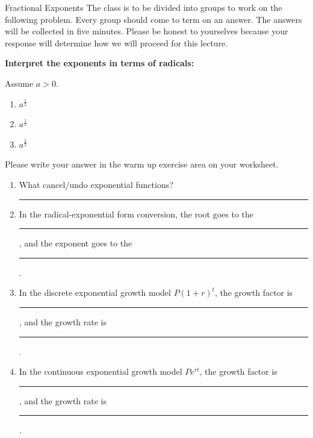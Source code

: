 \documentclass[10pt]{beamer}
\begin{document}
\begin{frame}{Fractional Exponents}
The class is to be divided into groups to work on the following problem. Every group should come to term on an answer. The answers will be collected in five minutes. Please be honest to yourselves because your response will determine how we will proceed for this lecture.

{\bf Interpret the exponents in terms of radicals:}

Assume $a>0$.
\begin{enumerate}[leftmargin = *, label = (\arabic*), itemsep=2em]
\item
\(a^\frac{1}{2}\)
\item 
\(a^\frac{1}{3}\)
\item 
\(a^\frac{2}{3}\)
\end{enumerate}
\end{frame}
\begin{frame}
Please write your answer in the warm up exercise area on your worksheet. 
\begin{enumerate}[leftmargin = *, label = (\arabic*), itemsep=2em]
\item
What cancel/undo exponential functions? \rule{6em}{0.4pt}
\item In the radical-exponential form conversion, the root goes to the \rule{6em}{0.4pt}, and the exponent goes to the \rule{6em}{0.4pt}.
\item In the discrete exponential growth model $P(1+r)^t$, the growth factor is \rule{6em}{0.4pt}, and the growth rate is \rule{6em}{0.4pt}.
\item In the continuous exponential growth model $Pe^{rt}$, the growth factor is \rule{6em}{0.4pt}, and the growth rate is \rule{6em}{0.4pt}.
\end{enumerate}
\end{frame}
\end{document}
